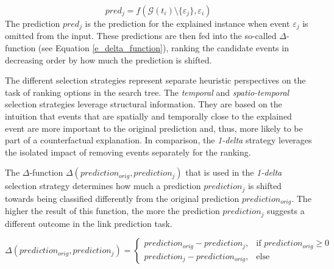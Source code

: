 \begin{itemize}
    \begin{equation}
        pred_j = f(\mathcal{G}(t_i) \setminus \{\varepsilon_j\}, \varepsilon_i)
    \end{equation}
    The prediction $pred_j$ is the prediction for the explained instance when event $\varepsilon_j$ is omitted from the input. These predictions are then fed into the so-called $\Delta$-function (see Equation \ref{e_delta_function}), ranking the candidate events in decreasing order by how much the prediction is shifted.
    
\end{itemize}

The different selection strategies represent separate heuristic perspectives on the task of ranking options in the search tree. The \textit{temporal} and \textit{spatio-temporal} selection strategies leverage structural information. They are based on the intuition that events that are spatially and temporally close to the explained event are more important to the original prediction and, thus, more likely to be part of a counterfactual explanation. In comparison, the \textit{1-delta} strategy leverages the isolated impact of removing events separately for the ranking.

The $\Delta$-function $\Delta(prediction_{orig}, prediction_j)$ that is used in the \textit{1-delta} selection strategy determines how much a prediction $prediction_j$ is shifted towards being classified differently from the original prediction $prediction_{orig}$. The higher the result of this function, the more the prediction $prediction_j$ suggests a different outcome in the link prediction task.

\begin{equation}
\label{e_delta_function}
    \Delta(prediction_{orig}, prediction_j) = 
    \begin{cases}
        prediction_{orig} - prediction_j,  &\text{if } prediction_{orig} \geq 0 \\
        prediction_j - prediction_{orig},  &\text{else}
    \end{cases}
\end{equation}


